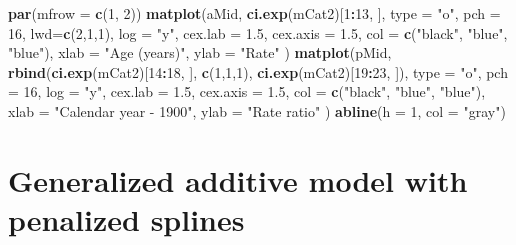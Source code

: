 \documentclass[
]{book}
\newenvironment{Shaded}{\begin{snugshade}}{\end{snugshade}}
\newcommand{\AttributeTok}[1]{\textcolor[rgb]{0.13,0.29,0.53}{#1}}
\newcommand{\DecValTok}[1]{\textcolor[rgb]{0.00,0.00,0.81}{#1}}
\newcommand{\FloatTok}[1]{\textcolor[rgb]{0.00,0.00,0.81}{#1}}
\newcommand{\FunctionTok}[1]{\textcolor[rgb]{0.13,0.29,0.53}{\textbf{#1}}}
\newcommand{\NormalTok}[1]{#1}
\newcommand{\SpecialCharTok}[1]{\textcolor[rgb]{0.81,0.36,0.00}{\textbf{#1}}}
\newcommand{\StringTok}[1]{\textcolor[rgb]{0.31,0.60,0.02}{#1}}
\begin{document}
\begin{Shaded}
\begin{Highlighting}[]
\FunctionTok{par}\NormalTok{(}\AttributeTok{mfrow =} \FunctionTok{c}\NormalTok{(}\DecValTok{1}\NormalTok{, }\DecValTok{2}\NormalTok{))}
\FunctionTok{matplot}\NormalTok{(aMid, }\FunctionTok{ci.exp}\NormalTok{(mCat2)[}\DecValTok{1}\SpecialCharTok{:}\DecValTok{13}\NormalTok{, ], }\AttributeTok{type =} \StringTok{"o"}\NormalTok{, }\AttributeTok{pch =} \DecValTok{16}\NormalTok{, }\AttributeTok{lwd=}\FunctionTok{c}\NormalTok{(}\DecValTok{2}\NormalTok{,}\DecValTok{1}\NormalTok{,}\DecValTok{1}\NormalTok{),  }
   \AttributeTok{log =} \StringTok{"y"}\NormalTok{, }\AttributeTok{cex.lab =} \FloatTok{1.5}\NormalTok{, }\AttributeTok{cex.axis =} \FloatTok{1.5}\NormalTok{, }
   \AttributeTok{col =} \FunctionTok{c}\NormalTok{(}\StringTok{"black"}\NormalTok{, }\StringTok{"blue"}\NormalTok{, }\StringTok{"blue"}\NormalTok{),}
  \AttributeTok{xlab =} \StringTok{"Age (years)"}\NormalTok{, }\AttributeTok{ylab =} \StringTok{"Rate"}\NormalTok{ )}
\FunctionTok{matplot}\NormalTok{(pMid, }\FunctionTok{rbind}\NormalTok{(}\FunctionTok{ci.exp}\NormalTok{(mCat2)[}\DecValTok{14}\SpecialCharTok{:}\DecValTok{18}\NormalTok{, ], }
                    \FunctionTok{c}\NormalTok{(}\DecValTok{1}\NormalTok{,}\DecValTok{1}\NormalTok{,}\DecValTok{1}\NormalTok{), }\FunctionTok{ci.exp}\NormalTok{(mCat2)[}\DecValTok{19}\SpecialCharTok{:}\DecValTok{23}\NormalTok{, ]),}
        \AttributeTok{type =} \StringTok{"o"}\NormalTok{, }\AttributeTok{pch =} \DecValTok{16}\NormalTok{, }\AttributeTok{log =} \StringTok{"y"}\NormalTok{, }\AttributeTok{cex.lab =} \FloatTok{1.5}\NormalTok{, }\AttributeTok{cex.axis =} \FloatTok{1.5}\NormalTok{,}
         \AttributeTok{col =} \FunctionTok{c}\NormalTok{(}\StringTok{"black"}\NormalTok{, }\StringTok{"blue"}\NormalTok{, }\StringTok{"blue"}\NormalTok{),}
        \AttributeTok{xlab =} \StringTok{"Calendar year {-} 1900"}\NormalTok{, }\AttributeTok{ylab =} \StringTok{"Rate ratio"}\NormalTok{ )}
\FunctionTok{abline}\NormalTok{(}\AttributeTok{h =} \DecValTok{1}\NormalTok{, }\AttributeTok{col =} \StringTok{"gray"}\NormalTok{)}
\end{Highlighting}
\end{Shaded}

\section{Generalized additive model with penalized splines}\label{generalized-additive-model-with-penalized-splines}
\end{document}
